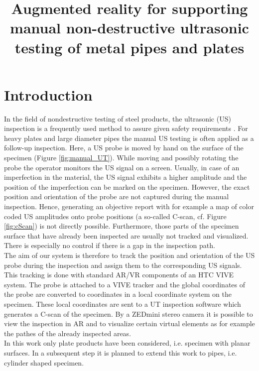 \documentclass{VRARWorkshop}
\title{Augmented reality for supporting manual non-destructive ultrasonic testing of metal pipes and plates}
\begin{document}
\section{Introduction}

In the field of nondestructive testing of steel products, the ultrasonic (US) inspection is a frequently used method to assure given safety requirements \cite{deutsch_zfp_2010} \cite{moles_introduction_2004} 
\cite{olympus_Grundlagen}. 
For heavy plates and large diameter pipes the manual US testing is often applied as a follow-up inspection. Here, a US probe is moved by hand on the surface of the specimen (Figure \ref{fig:manual_UT}). While moving and possibly rotating the probe the operator monitors the US signal on a screen. Usually, in case of an imperfection in the material, the US signal exhibits a higher amplitude and the position of the imperfection can be marked on the specimen.
However, the exact position and orientation of the probe are not captured during the manual inspection. Hence, generating an objective report with for example a map of color coded US amplitudes onto probe positions (a so-called C-scan, cf. Figure \ref{fig:cScan}) is not directly possible. 
Furthermore, those parts of the specimen surface that have already been inspected are usually not tracked and visualized.
There is especially no control if there is a gap in the inspection path. \\
The aim of our system is therefore to track the position and orientation of the US probe during the inspection and assign them to the corresponding US signals. This tracking is done with standard AR/VR components of an HTC VIVE system. The probe is attached to a VIVE tracker and the global coordinates of the probe are converted to coordinates in a local coordinate system on the specimen. These local coordinates are sent to a UT inspection software which generates a C-scan of the specimen. 
By a ZEDmini stereo camera it is possible to view the inspection in AR and to visualize certain virtual elements as for example the pathes of the already inspected areas. \\
In this work only plate products have been considered, i.e. specimen with planar surfaces. In a subsequent step it is planned to extend this work to pipes, i.e. cylinder shaped specimen.
\end{document}
